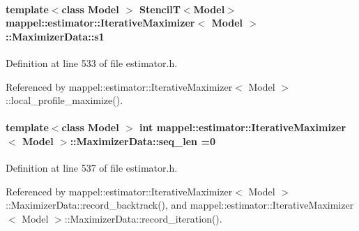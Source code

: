 \paragraph[{\texorpdfstring{s1}{s1}}]{\setlength{\rightskip}{0pt plus 5cm}template$<$class Model $>$ {\bf StencilT}$<$Model$>$ {\bf mappel\+::estimator\+::\+Iterative\+Maximizer}$<$ Model $>$\+::Maximizer\+Data\+::s1\hspace{0.3cm}{\ttfamily [protected]}}\hypertarget{classmappel_1_1estimator_1_1IterativeMaximizer_1_1MaximizerData_afbda1c2de786b3784fb278c4fbd56c3f}{}\label{classmappel_1_1estimator_1_1IterativeMaximizer_1_1MaximizerData_afbda1c2de786b3784fb278c4fbd56c3f}


Definition at line 533 of file estimator.\+h.



Referenced by mappel\+::estimator\+::\+Iterative\+Maximizer$<$ Model $>$\+::local\+\_\+profile\+\_\+maximize().

\paragraph[{\texorpdfstring{seq\+\_\+len}{seq_len}}]{\setlength{\rightskip}{0pt plus 5cm}template$<$class Model $>$ int {\bf mappel\+::estimator\+::\+Iterative\+Maximizer}$<$ Model $>$\+::Maximizer\+Data\+::seq\+\_\+len =0\hspace{0.3cm}{\ttfamily [protected]}}\hypertarget{classmappel_1_1estimator_1_1IterativeMaximizer_1_1MaximizerData_a13c682174ed62ae2b55e4c22ca4ad57b}{}\label{classmappel_1_1estimator_1_1IterativeMaximizer_1_1MaximizerData_a13c682174ed62ae2b55e4c22ca4ad57b}


Definition at line 537 of file estimator.\+h.



Referenced by mappel\+::estimator\+::\+Iterative\+Maximizer$<$ Model $>$\+::\+Maximizer\+Data\+::record\+\_\+backtrack(), and mappel\+::estimator\+::\+Iterative\+Maximizer$<$ Model $>$\+::\+Maximizer\+Data\+::record\+\_\+iteration().

